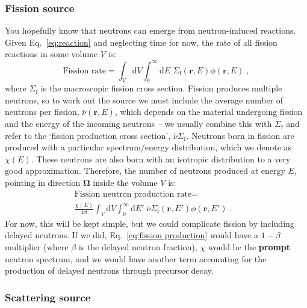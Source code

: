 \documentclass{article}
\begin{document}
\subsubsection{Fission source}

You hopefully know that neutrons can emerge from neutron-induced reactions. Given Eq.~\eqref{eq:reaction} and neglecting time for now, the rate of all fission reactions in some volume $V$ is:
\begin{equation}
    \textrm{Fission rate} = \int_V \mathrm{d}V\int^\infty_0 \mathrm{d}E \;\Sigma_\mathrm{f}(\mathbf{r},E)\phi(\mathbf{r},E)\;\mathrm{,}
\end{equation}
where $\Sigma_\mathrm{f}$ is the macroscopic fission cross section. Fission produces multiple neutrons, so to work out the source we must include the average number of neutrons per fission, $\bar{\nu}(\mathbf{r},E)$, which depends on the material undergoing fission and the energy of the incoming neutrons -- we usually combine this with $\Sigma_\mathrm{f}$ and refer to the `fission production cross section', $\bar{\nu}\Sigma_\mathrm{f}$. Neutrons born in fission are produced with a particular spectrum/energy distribution, which we denote as $\chi(E)$. These neutrons are also born with an isotropic distribution to a very good approximation. Therefore, the number of neutrons produced at energy $E$, pointing in direction $\mathbf{\Omega}$ inside the volume $V$ is:
\begin{equation}\label{eq:fission production}
\begin{split}
    \textrm{Fission neutron production rate} = &\\
    \frac{\chi(E)}{4\pi}\int_V \mathrm{d}V\int^\infty_0 \mathrm{d}E' \;\bar{\nu}\Sigma_\mathrm{f}(\mathbf{r},E')\phi(\mathbf{r},E')\;\mathrm{.}
\end{split}
\end{equation}
For now, this will be kept simple, but we could complicate fission by including delayed neutrons. If we did, Eq.~\eqref{eq:fission production} would have a $1-\beta$ multiplier (where $\beta$ is the delayed neutron fraction), $\chi$ would be the \textbf{prompt} neutron spectrum, and we would have another term accounting for the production of delayed neutrons through precursor decay.

\subsubsection{Scattering source}
\end{document}
